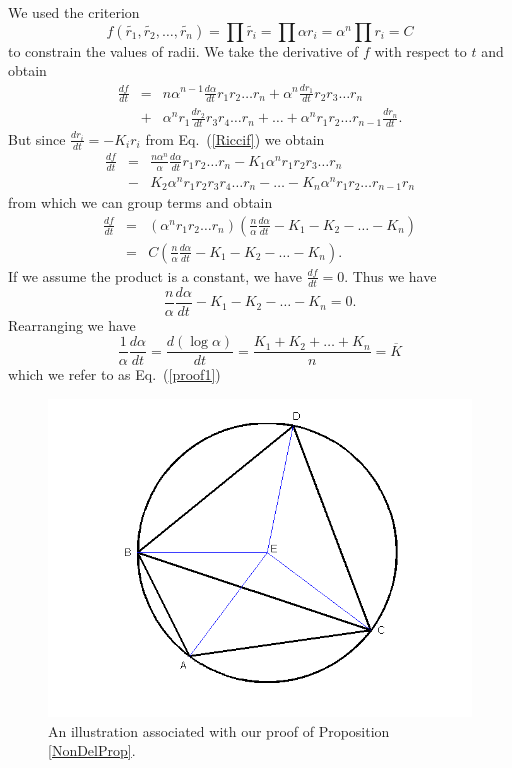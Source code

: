 \documentclass[12pt]{article}
\begin{document}
	We used the criterion $$f(\tilde{r_1},\tilde{r_2},\ldots,\tilde{r_n}) = \prod{\tilde{r_i}} = \prod{\alpha r_i} = \alpha^n\prod{r_i}= C$$ to constrain the values of radii. We take the derivative of $f$ with respect to $t$ and obtain
	\begin{eqnarray*}
	\frac{df}{dt} & = & n\alpha^{n-1}\frac{d\alpha}{dt}r_1r_2\ldots r_n + \alpha^n\frac{dr_1}{dt}r_2r_3\ldots r_n\\
								& + & \alpha^nr_1\frac{dr_2}{dt}r_3r_4\ldots r_n + \ldots + \alpha^nr_1r_2\ldots r_{n-1}\frac{dr_n}{dt}.
	\end{eqnarray*}
	But since $\displaystyle \frac{dr_i}{dt} = -K_ir_i$ from Eq.~(\ref{Riccif}) we obtain
	\begin{eqnarray*}
	\frac{df}{dt} & = & \frac{n\alpha^{n}}{\alpha}\frac{d\alpha}{dt}r_1r_2\ldots r_n - K_1\alpha^nr_1r_2r_3\ldots r_n\\
								& - & K_2\alpha^nr_1r_2r_3r_4\ldots r_n - \ldots - K_n\alpha^nr_1r_2\ldots r_{n-1}r_n
	\end{eqnarray*}
	from which we can group terms and obtain
	\begin{eqnarray*}
	\frac{df}{dt} & = & (\alpha^nr_1r_2\ldots r_n)(\frac{n}{\alpha}\frac{d\alpha}{dt} - K_1 - K_2 - \ldots - K_n)\\
								& = & C(\frac{n}{\alpha}\frac{d\alpha}{dt} - K_1 - K_2 - \ldots - K_n).
	\end{eqnarray*}
	If we assume the product is a constant, we have $\displaystyle \frac{df}{dt} = 0.$ Thus we have $$\frac{n}{\alpha}\frac{d\alpha}{dt} - K_1 - K_2 - \ldots - K_n = 0.$$
	Rearranging we have
$$\frac{1}{\alpha}\frac{d\alpha}{dt} = \frac{d(\log \alpha)}{dt} = \frac{K_1 + K_2 + \ldots + K_n}{n} = \overline{K}$$
	which we refer to as Eq.~(\ref{proof1})

\begin{figure}
\label{NonDelPropfig}
\centering
\includegraphics[scale = 0.5]{Pictures3/geometryU.png}
\caption{An illustration associated with our proof of Proposition \ref{NonDelProp}.}
\end{figure}
\end{document}
